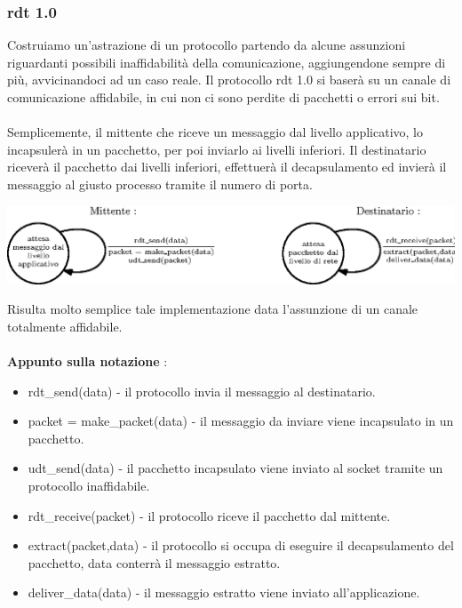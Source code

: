 \documentclass[12pt, letterpaper]{article}
\newcommand{\acc}{\\\hphantom{}\\}
\begin{document}
\subsubsection{rdt 1.0}
Costruiamo un'astrazione di un protocollo partendo da alcune assunzioni riguardanti possibili
inaffidabilità della comunicazione, aggiungendone sempre di più,
avvicinandoci ad un caso reale. Il protocollo rdt 1.0 si baserà su un
canale di comunicazione affidabile, in cui non ci sono perdite di
pacchetti o errori sui bit.\acc
Semplicemente, il mittente che riceve un messaggio dal livello applicativo,
lo incapsulerà in un pacchetto, per poi inviarlo ai livelli inferiori.
Il destinatario riceverà il pacchetto dai livelli inferiori,
effettuerà il decapsulamento ed invierà il messaggio al giusto
processo tramite il numero di porta.\begin{center}
    \includegraphics[width=\textwidth ]{images/rdt1.0.eps}
\end{center}
Risulta molto semplice tale implementazione data l'assunzione di un
canale totalmente affidabile.\acc
\textbf{Appunto sulla notazione} : \begin{itemize}
    \item rdt\_send(data) - il protocollo invia il messaggio al
          destinatario.
    \item packet = make\_packet(data) - il messaggio da inviare viene
          incapsulato in un pacchetto.
    \item udt\_send(data) - il pacchetto incapsulato viene inviato
          al socket tramite un protocollo inaffidabile.
    \item rdt\_receive(packet) - il protocollo riceve il pacchetto dal mittente.
    \item extract(packet,data) - il protocollo si occupa di eseguire il decapsulamento del pacchetto,
          data conterrà il messaggio estratto.
    \item deliver\_data(data) - il messaggio estratto viene inviato all'applicazione.
\end{itemize}
\end{document}
